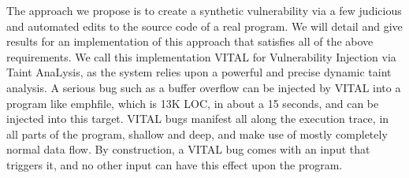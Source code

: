 The approach we propose is to create a synthetic vulnerability via a few judicious and automated edits to the source code of a real program.
We will detail and give results for an implementation of this approach that satisfies all of the above requirements.
We call this implementation VITAL for Vulnerability Injection via Taint AnaLysis, as the system relies upon a powerful and precise dynamic taint analysis.  
A serious bug such as a buffer overflow can be injected by VITAL into a program like emph{file}, which is 13K LOC, in about a 15 seconds, and can be injected into this target.
VITAL bugs manifest all along the execution trace, in all parts of the program, shallow and deep, and make use of mostly completely normal data flow.
By construction, a VITAL bug comes with an input that triggers it, and no other input can have this effect upon the program.
